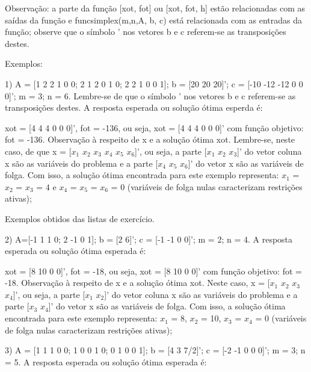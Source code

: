 \documentclass[10pt]{article}
\begin{document}
Observação: a parte da função [xot, fot] ou [xot, fot, h] estão relacionadas com as saídas da função e funcsimplex(m,n,A, b, c) está relacionada com as entradas da função; observe que o símbolo ' nos vetores b e c referem-se as transposições destes.

Exemplos:
\newline

1)
A = [1 2 2 1 0 0; 2 1 2 0 1 0; 2 2 1 0 0 1]; b = [20 20 20]'; c = [-10 -12 -12 0 0 0]'; m = 3; n = 6. Lembre-se de que o símbolo ' nos vetores b e c referem-se as transposições destes. A resposta esperada ou solução ótima esperda é:
\newline

xot = [4 4 4 0 0 0]', fot = -136, ou seja, xot = [4 4 4 0 0 0]' com função objetivo: fot = -136.
\newline
Observação à respeito de x e a solução ótima xot. Lembre-se, neste caso, de que x = [$x_1$ $x_2$ $x_3$ $x_4$ $x_5$ $x_6$]', ou seja, a parte [$x_1$ $x_2$ $x_3$]' do vetor coluna x são as variáveis do problema e a parte [$x_4$ $x_5$ $x_6$]' do vetor x são as variáveis de folga. Com isso, a solução ótima encontrada para este exemplo representa: $x_1$ = $x_2$ = $x_3$ = $4$ e $x_4$ = $x_5$ = $x_6$ = $0$ (variáveis de folga nulas caracterizam restrições ativas);
\newline

Exemplos obtidos das listas de exercício.
\newline

2) A=[-1 1 1 0; 2 -1 0 1]; b = [2 6]'; c = [-1 -1 0 0]'; m = 2; n = 4. A resposta esperada ou solução ótima esperada é:
\newline

xot = [8 10 0 0]', fot = -18, ou seja, xot = [8 10 0 0]' com função objetivo: fot = -18.
\newline
Observação à respeito de x e a solução ótima xot. Neste caso, x = [$x_1$ $x_2$ $x_3$ $x_4$]', ou seja, a parte [$x_1$ $x_2$]' do vetor coluna x são as variáveis do problema e a parte [$x_3$ $x_4$]' do vetor x são as variáveis de folga. Com isso, a solução ótima encontrada para este exemplo representa: $x_1$ = 8, $x_2$ = 10, $x_3$ = $x_4$ = 0 (variáveis de folga nulas caracterizam restrições ativas);
\newline

3) A = [1 1 1 0 0; 1 0 0 1 0; 0 1 0 0 1]; b = [4 3 7/2]'; c = [-2 -1 0 0 0]'; m = 3; n = 5. A resposta esperada ou solução ótima esperada é:
\newline
\end{document}
